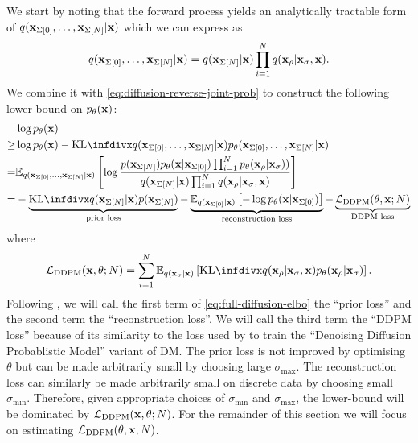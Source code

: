 We start by noting that the forward process yields an analytically tractable form of $q({\mathbf{x}}_{\Sigma[0]},\ldots,{\mathbf{x}}_{\Sigma[N]}|{\mathbf{x}})$ which we can express as
\begin{equation}
    q({\mathbf{x}}_{\Sigma[0]},\ldots,{\mathbf{x}}_{\Sigma[N]}|{\mathbf{x}}) = q({\mathbf{x}}_{\Sigma[N]}|{\mathbf{x}}) \prod_{i=1}^N q({\mathbf{x}}_{\rho} | {\mathbf{x}}_{\sigma}, {\mathbf{x}}).
\end{equation}We combine it with \cref{eq:diffusion-reverse-joint-prob} to construct the following lower-bound on $p_\theta({\mathbf{x}})$:
\begin{align}
    &\log p_\theta(\rvx) \\
    \geq &\log p_\theta(\rvx) - \kl{q(\rvx_{\Sigma[0]},\ldots,\rvx_{\Sigma[N]}|\rvx)}{p_\theta(\rvx_{\Sigma[0]},\ldots,\rvx_{\Sigma[N]}|\rvx)} \\
    = &\EX_{q(\rvx_{\Sigma[0]},\ldots,\rvx_{\Sigma[N]}|\rvx)} \left[ \log \frac{p(\rvx_{\Sigma[N]}) p_\theta(\rvx|\rvx_{\Sigma[0]}) \prod_{i=1}^N p_\theta(\rvx_{\rho} | \rvx_{\sigma}) ) }{q(\rvx_{\Sigma[N]}|\rvx) \prod_{i=1}^N q(\rvx_{\rho} | \rvx_{\sigma}, \rvx)} \right] \\
    = & -\underbrace{\kl{q(\rvx_{\Sigma[N]}|\rvx)}{p(\rvx_{\Sigma[N]})}}_\text{prior loss} - \underbrace{\EX_{q(\rvx_{\Sigma[0]}|\rvx)} \left[ - \log p_\theta(\rvx|\rvx_{\Sigma[0]}) \right]}_\text{reconstruction loss} - \underbrace{\mathcal{L}_\text{DDPM}(\theta, \rvx; N)}_\text{DDPM loss} \label{eq:full-diffusion-elbo}
\end{align}
where
\begin{align}
    \mathcal{L}_\text{DDPM}(\rvx, \theta; N) = \sum_{i=1}^N \EX_{q(\rvx_{\sigma}|\rvx)} \left[ \kl{q(\rvx_{\rho} | \rvx_{\sigma}, \rvx)}{p_\theta(\rvx_{\rho} | \rvx_{\sigma})} \right].
\end{align}
Following \citet{kingma2021variational}, we will call the first term of \cref{eq:full-diffusion-elbo} the ``prior loss'' and the second term the ``reconstruction loss''. We will call the third term the ``DDPM loss'' because of its similarity to the loss used by \citet{ho2020denoising} to train the ``Denoising Diffusion Probablistic Model'' variant of DM. The prior loss is not improved by optimising $\theta$ but can be made arbitrarily small by choosing large $\sigma_\text{max}$. The reconstruction loss can similarly be made arbitrarily small on discrete data by choosing small $\sigma_\text{min}$. Therefore, given appropriate choices of $\sigma_\text{min}$ and $\sigma_\text{max}$, the lower-bound will be dominated by $\mathcal{L}_\text{DDPM}({\mathbf{x}}, \theta; N)$. For the remainder of this section we will focus on estimating $\mathcal{L}_\text{DDPM}(\theta, {\mathbf{x}}; N)$.


